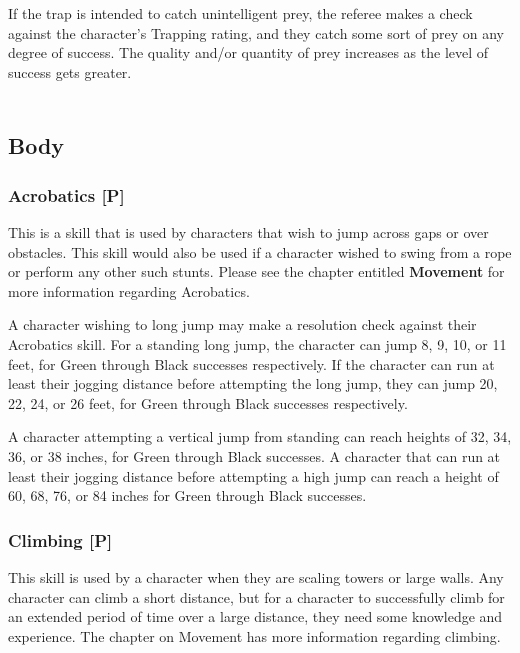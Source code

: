 \documentclass[oneside]{book}
\begin{document}
\begin{multicols}{2}
If the trap is intended to catch unintelligent prey, the referee makes a check against the character's Trapping rating, and they catch some sort of prey on any degree of success. The quality and/or quantity of prey increases as the level of success gets greater. 
\\
\\
\subsection{Body}
\subsubsection{Acrobatics [P]}
This is a skill that is used by characters that wish to jump across gaps or over obstacles. This skill would also be used if a character wished to swing from a rope or perform any other such stunts. Please see the chapter entitled \textbf{Movement} for more information regarding Acrobatics.

A character wishing to long jump may make a resolution check against their Acrobatics skill. For a standing long jump, the character can jump 8, 9, 10, or 11 feet, for Green through Black successes respectively.
If the character can run at least their jogging distance before attempting the long jump, they can jump 20, 22, 24, or 26 feet, for Green through Black successes respectively.

A character attempting a vertical jump from standing can reach heights of 32, 34, 36, or 38 inches, for Green through Black successes. A character that can run at least their jogging distance before attempting a high jump can reach a height of 60, 68, 76, or 84 inches for Green through Black successes.
\subsubsection{Climbing [P]}
This skill is used by a character when they are scaling towers or large walls. Any character can climb a short distance, but for a character to successfully climb for an extended period of time over a large distance, they need some knowledge and experience. The chapter on Movement has more information regarding climbing. 


\end{multicols}
\end{document}
